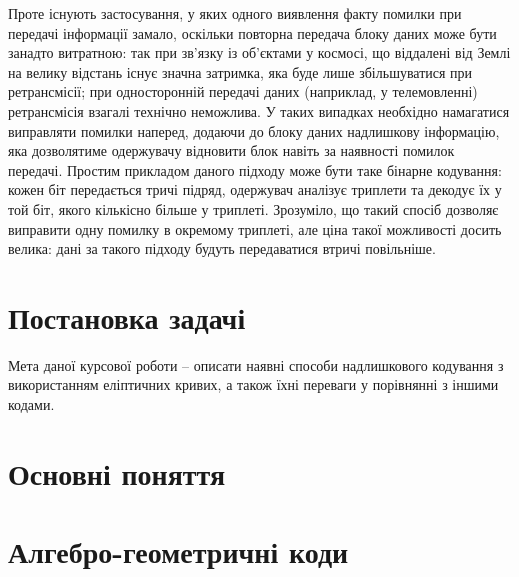 \documentclass[a4paper,12pt,oneside]{article}
\begin{document}
Проте існують застосування, у яких одного виявлення факту помилки при передачі інформації замало, оскільки повторна передача блоку даних може бути занадто витратною: 
так при зв'язку із об'єктами у космосі, що віддалені від Землі на велику відстань існує значна затримка, яка буде лише збільшуватися при ретрансмісії; 
при односторонній передачі даних (наприклад, у телемовленні) ретрансмісія взагалі технічно неможлива. 
У таких випадках необхідно намагатися виправляти помилки наперед, додаючи до блоку даних надлишкову інформацію, яка дозволятиме одержувачу відновити блок навіть за наявності помилок передачі. 
Простим прикладом даного підходу може бути таке бінарне кодування: кожен біт передається тричі підряд, одержувач аналізує триплети та декодує їх у той біт, якого кількісно більше у триплеті. 
Зрозуміло, що такий спосіб дозволяє виправити одну помилку в окремому триплеті, але ціна такої можливості досить велика: дані за такого підходу будуть передаватися втричі повільніше.

\section{Постановка задачі}
Мета даної курсової роботи -- описати наявні способи надлишкового кодування з використанням еліптичних кривих, а також їхні переваги у порівнянні з іншими кодами.

\section{Основні поняття}

\section{Алгебро-геометричні коди}

\nocite{*}

\clearpage
{}

\end{document}
